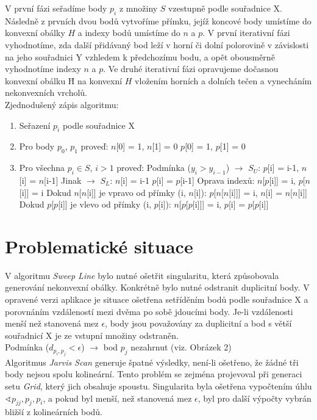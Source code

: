 \documentclass[a4paper, 12pt]{article}
\begin{document}
V první fázi seřadíme body $p_i$ z množiny $S$ vzestupně podle souřadnice X. Následně z prvních dvou bodů vytvoříme přímku, jejíž koncové body umístíme do konvexní obálky $H$ a indexy bodů umístíme do $n$ a $p$. V první iterativní fázi vyhodnotíme, zda další přidávaný bod leží v horní či dolní polorovině v závislosti na jeho souřadnici Y vzhledem k předchozímu bodu, a opět obousměrně vyhodnotíme indexy $n$ a $p$. Ve druhé iterativní fázi opravujeme dočasnou konvexní obálku \={H} na konvexní $H$ vložením horních a dolních tečen a vynecháním nekonvexních vrcholů.\\

Zjednodušený zápis algoritmu: 
\begin{enumerate}
\item Seřazení $p_i$ podle souřadnice X
\item Pro body $p_0$, $p_1$ proveď:
\subitem $n$[0] = 1, $n$[1] = 0
\subitem $p$[0] = 1, $p$[1] = 0
\item Pro všechna $p_i \in S$, $i > 1$ proveď:
\subitem Podmínka ($y_i > y_{i-1}$) $\rightarrow$ $S_U$: $p$[i] = i-1, $n$[i] = $n$[i-1]
\subitem Jinak $\rightarrow$ $S_L$: $n$[i] = i-1 $p$[i] = $p$[i-1]
\subitem Oprava indexů: $n$[$p$[i]] = i, $p$[$n$[i]] = i
\subitem Dokud $n$[$n$[i]] je vpravo od přímky (i, $n$[i]):
\subsubitem $p$[$n$[$n$[i]]] = i, $n$[i] = $n$[$n$[i]]
\subitem Dokud $p$[$p$[i]] je vlevo od přímky (i, $p$[i]):
\subsubitem $n$[$p$[$p$[i]]] = i, $p$[i] = $p$[$p$[i]]
\end{enumerate}

\section{Problematické situace}
V algoritmu \textit{Sweep Line} bylo nutné ošetřit singularitu, která způsobovala generování nekonvexní obálky. Konkrétně bylo nutné odstranit duplicitní body. V opravené verzi aplikace je situace ošetřena setříděním bodů podle souřadnice X a porovnáním vzdáleností mezi dvěma po sobě jdoucími body. Je-li vzdálenosti menší než stanovená mez $\epsilon$, body jsou považovány za duplicitní a bod s větší souřadnicí X je ze vstupní množiny odstraněn. \\

Podmínka ($d_{p_i,p_j} < \epsilon$) $\rightarrow$ bod $p_j$ nezahrnut (viz. Obrázek 2)\\


Algoritmus \textit{Jarvis Scan} generuje špatné výsledky, není-li ošetřeno, že žádné tři body nejsou spolu kolineární. Tento problém se zejména projevoval při generaci setu \textit{Grid}, který jich obsahuje spoustu. Singularita byla ošetřena vypočtením úhlu $\sphericalangle p_{jj}, p_j, p_i$, a pokud byl menší, než stanovená mez $\epsilon$, byl pro další výpočty vybrán bližší z kolineárních bodů.
\end{document}
